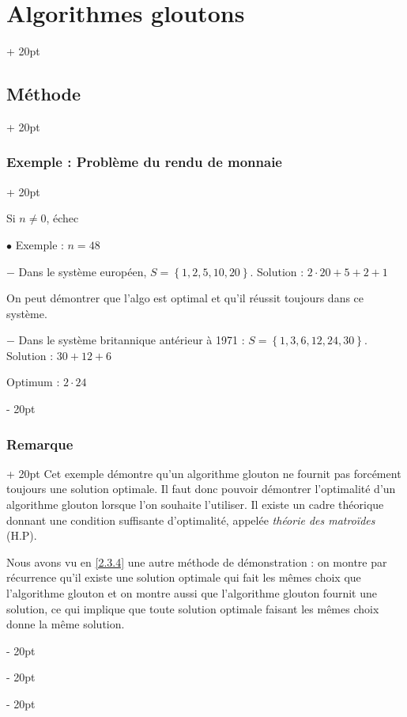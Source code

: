 \documentclass[a4paper, 12pt, twoside]{article}
\newcommand{\set}[1]{\left\{ #1 \right\}}
\newcommand{\ind}[1][20pt]{\advance\leftskip + #1}
\newcommand{\deind}[1][20pt]{\advance\leftskip - #1}
\newenvironment{indt}[2][20pt]{#2 \par \ind[#1]}{\par \deind} %
\begin{document}
\begin{indt}{\section{Algorithmes gloutons}}
\begin{indt}{\subsection{Méthode}}
\begin{indt}{\subsubsection{Exemple : Problème du rendu de monnaie}}
\begin{pseudocode}
                    Si $n \neq 0$, échec
                \end{pseudocode}
                
                \vspace{12pt}
                
                $\bullet$ Exemple : $n = 48$
                
                $-$ Dans le système européen, $S = \set{1, 2, 5, 10, 20}$.
                Solution : $2 \cdot 20 + 5 + 2 + 1$
                
                On peut démontrer que l'algo est optimal et qu'il réussit toujours dans ce système.
                
                $-$ Dans le système britannique antérieur à 1971 : $S = \set{1, 3, 6, 12, 24, 30}$.
                Solution : $30 + 12 + 6$
                
                Optimum : $2 \cdot 24$
            \end{indt}
            
            \vspace{12pt}
            
            \begin{indt}{\subsubsection{Remarque}}
                Cet exemple démontre qu'un algorithme glouton ne fournit pas forcément toujours une solution optimale. Il faut donc pouvoir démontrer l'optimalité d'un algorithme glouton lorsque l'on souhaite l'utiliser. Il existe un cadre théorique donnant une condition suffisante d'optimalité, appelée \textit{théorie des matroïdes} (H.P).
                
                Nous avons vu en \ref{2.3.4} une autre méthode de démonstration : on montre par récurrence qu'il existe une solution optimale qui fait les mêmes choix que l'algorithme glouton et on montre aussi que l'algorithme glouton fournit une solution, ce qui implique que toute solution optimale faisant les mêmes choix donne la même solution.
            \end{indt}
        \end{indt}
        
        \vspace{12pt}
        

\end{indt}
\end{document}
